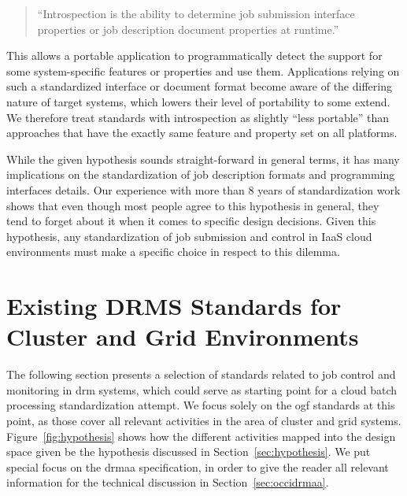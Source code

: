 \documentclass[twocolumn]{svjour3}       %
\begin{document}
\begin{quote}
``Introspection is the ability to determine job submission interface properties or job description document properties at runtime.''
\end{quote}

This allows a portable application to programmatically detect the support for some system-specific features or properties and use them. Applications relying on such a standardized interface or document format become aware of the differing nature of target systems, which lowers their level of portability to some extend. We therefore treat standards with introspection as slightly ``less portable'' than approaches that have the exactly same feature and property set on all platforms.



While the given hypothesis sounds straight-forward in general terms, it has many implications on the standardization of job description formats and programming interfaces details. Our experience with more than 8 years of standardization work shows that even though most people agree to this hypothesis in general, they tend to forget about it when it comes to specific design decisions. Given this hypothesis, any standardization of job submission and control in IaaS cloud environments must make a specific choice in respect to this dilemma.  


\section{Existing DRMS Standards for Cluster and Grid Environments}
\label{sec:relatedwork}

The following section presents a selection of standards related to job control and monitoring in \gls{drm} systems, which could serve as starting point for a cloud batch processing standardization attempt. We focus solely on the \gls{ogf} standards at this point, as those cover all relevant activities in the area of cluster and grid systems. Figure~\ref{fig:hypothesis} shows how the different activities mapped into the design space given be the hypothesis discussed in Section~\ref{sec:hypothesis}. We put special focus on the \gls{drmaa} specification, in order to give the reader all relevant information for the technical discussion in Section~\ref{sec:occidrmaa}.
\end{document}
